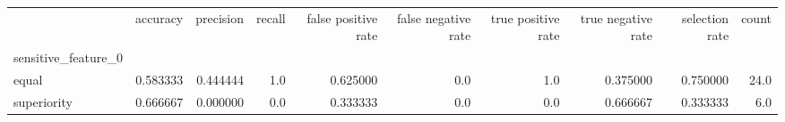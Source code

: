 \begin{tabular}{lrrrrrrrrr}
\toprule
{} &  accuracy &  precision &  recall &  false positive rate &  false negative rate &  true positive rate &  true negative rate &  selection rate &  count \\
sensitive\_feature\_0 &           &            &         &                      &                      &                     &                     &                 &        \\
\midrule
equal               &  0.583333 &   0.444444 &     1.0 &             0.625000 &                  0.0 &                 1.0 &            0.375000 &        0.750000 &   24.0 \\
superiority         &  0.666667 &   0.000000 &     0.0 &             0.333333 &                  0.0 &                 0.0 &            0.666667 &        0.333333 &    6.0 \\
\bottomrule
\end{tabular}

